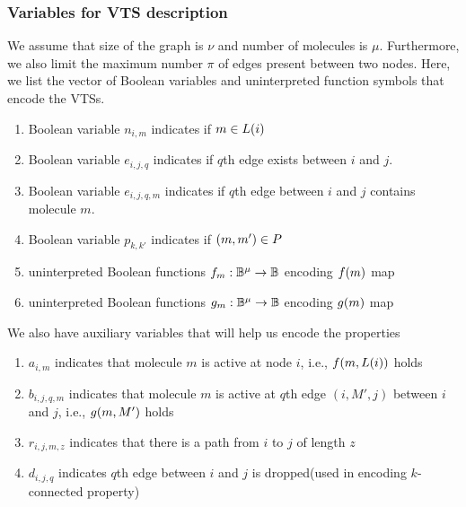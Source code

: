 \subsubsection{Variables for VTS description}
%
We assume that size of the graph is $\nu$ and number of molecules is
$\mu$.
%
Furthermore, we also limit the maximum number $\pi$ of edges present
between two nodes.
%
Here, we list the vector of Boolean variables and uninterpreted function symbols
that encode the VTSs.
\begin{enumerate}

\item Boolean variable $n_{i,m}$ indicates if $m \in L(i)$
\item Boolean variable $e_{i,j,q}$ indicates if $q$th edge exists between $i$ and $j$.
\item Boolean variable $e_{i,j,q,m}$ indicates if $q$th edge between $i$ and $j$ contains molecule $m$.

\item Boolean variable $p_{k,k'}$ indicates if $(m,m') \in P$
\item uninterpreted Boolean functions $f_m : \mathbb{B}^\mu \rightarrow \mathbb{B}$
encoding $f(m)$ map
\item uninterpreted Boolean functions $g_m : \mathbb{B}^\mu \rightarrow \mathbb{B}$
encoding $g(m)$ map
\end{enumerate}

We also have auxiliary variables that will help us encode the properties 
\begin{enumerate}
\item $a_{i,m}$ indicates that molecule $m$ is active at node $i$, i.e., $f(m,L(i))$
  holds
\item $b_{i,j,q,m}$ indicates that molecule $m$ is active at $q$th edge $(i,M',j)$ between $i$ and $j$, i.e., $g(m,M')$ holds
\item $r_{i,j,m,z}$ indicates that there is a path from $i$ to $j$ of length $z$
\item $d_{i,j,q}$ indicates $q$th edge between $i$ and $j$ is dropped(used in encoding
  $k$-connected property)
\end{enumerate}




